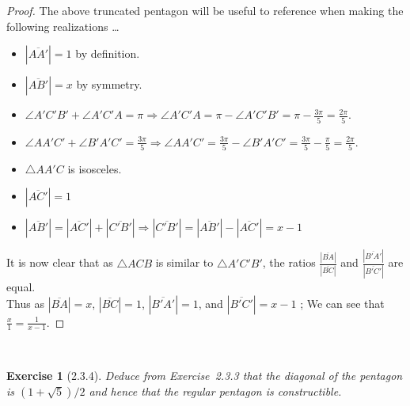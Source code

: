 \documentclass[12pt]{article}
\newcommand{\XB}{\color{black}}
\newcommand{\XBB}{\color{blue}}
\newcommand{\ds}{\displaystyle}
\theoremstyle{plain}
\newtheorem{ex}{Exercise}
\begin{document}
\begin{proof}
  The above truncated pentagon will be useful to reference when making the following realizations \dots
  \begin{itemize}
    \item $ \ds |\overline{AA'}| = 1 $ by definition.
    \item $ \ds |\overline{AB'}| = x $ by symmetry.
    \item $ \ds \angle A'C'B' + \angle A'C'A = \pi \Rightarrow \angle A'C'A = \pi - \angle A'C'B' = \pi - \frac{3\pi}{5} = \frac{2\pi}{5} $.
    \item $ \ds \angle AA'C' + \angle B'A'C' = \frac{3\pi}{5} \Rightarrow \angle AA'C' = \frac{3\pi}{5} - \angle B'A'C' = \frac{3\pi}{5} - \frac{\pi}{5} = \frac{2\pi}{5} $.
    \item $ \ds \triangle AA'C $ is isosceles.
    \item $ \ds |\overline{AC'}| = 1 $
    \item $ \ds |\overline{AB'}| = |\overline{AC'}| + |\overline{C'B'}| \Rightarrow |\overline{C'B'}| = |\overline{AB'}| - |\overline{AC'}| = x - 1 $
  \end{itemize}

  It is now clear that as $ \ds \triangle ACB $ is similar to $ \ds \triangle A'C'B' $, the ratios $ \ds \frac{|\overline{BA}|}{|\overline{BC}|} $ and $ \ds \frac{|\overline{B'A'}|}{|\overline{B'C'}|} $ are equal. \\

  Thus as $ \ds |\overline{BA}| = x $, $ \ds |\overline{BC}| = 1 $, $ \ds |\overline{B'A'}| = 1 $, and $ \ds |\overline{B'C'}| = x - 1 $ ; We can see that $ \ds \frac{x}{1} = \frac{1}{x-1} $.
\end{proof}

\newpage
\XBB\hrulefill\XB \\
\begin{ex} [2.3.4]
  Deduce from Exercise~2.3.3 that the diagonal of the pentagon is $(1+\sqrt{5})/2$ and hence that the regular pentagon is constructible.
\end{ex}
\XBB\hrulefill\XB \\
\end{document}
